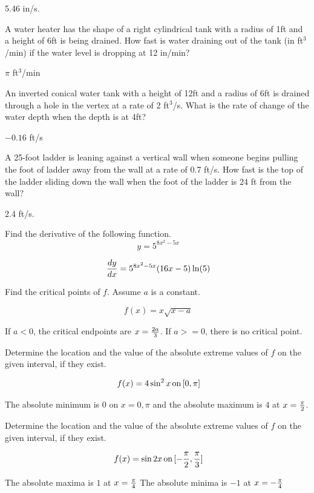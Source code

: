\bigskip

5.46 in/s.
\bigskip

A water heater has the shape of a right cylindrical tank
with a radius of 1ft and a height of 6ft is being drained.
How fast is water draining out of the tank (in ft$^3$/min) if
the water level is dropping at 12 in/min?
\bigskip

$\pi$ ft$^3$/min
\bigskip

An inverted conical water tank with a height of 12ft and
a radius of 6ft is drained through a hole in the vertex
at a rate of 2 ft$^3$/s. What is the rate of change of the
water depth when the depth is at 4ft?
\bigskip

$-0.16$ ft/s
\bigskip

A 25-foot ladder is leaning against a vertical wall when someone
begins pulling the foot of ladder away from the wall at a rate
of 0.7 ft/s. How fast is the top of the ladder sliding down the wall
when the foot of the ladder is 24 ft from the wall?
\bigskip

2.4 ft/s.
\bigskip

Find the derivative of the following function.
$$\
y = 5^{8x^2 - 5x}
$$

$$\
{dy \over dx} =
5^{8x^2 - 5x}
(16x - 5)
\ln(5)
$$

Find the critical points of $f$. Assume $a$ is a constant.

$$\
f(x) = x \sqrt{x - a}
$$

If $a < 0$, the critical endpoints are $x = {2a \over 3}$.
If $a >= 0$, there is no critical point.

\problem{4.1.49}
Determine the location and the value of the absolute extreme
values of $f$ on the given interval, if they exist.

$$\
f(x) = 4\sin^2x \, \hbox{on} \, [0, \pi]
$$

The absolute minimum is $0$ on $x = 0, \pi$ and the absolute
maximum is $4$ at $x = {\pi \over 2}$.

\problem{4.1.51}
Determine the location and the value of the absolute extreme
values of $f$ on the given interval, if they exist.

$$\
f(x) = \sin 2x \, \hbox{on} \, [-{\pi \over 2}, {\pi \over 3}]
$$

The absolute maxima is $1$ at $x = {\pi \over 4}$
The absolute minima is $-1$ at $x = -{\pi \over 4}$

